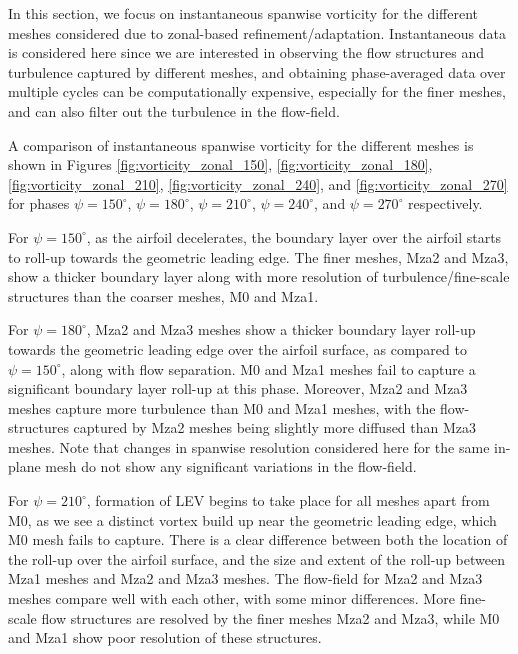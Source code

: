 In this section, we focus on instantaneous spanwise vorticity for the different meshes considered due to zonal-based refinement/adaptation. 
Instantaneous data is considered here since we are interested in observing the flow structures and turbulence captured by different meshes, and obtaining phase-averaged data over multiple cycles can be computationally expensive, especially for the finer meshes, and can also filter out the turbulence in the flow-field.

A comparison of instantaneous spanwise vorticity for the different meshes is shown in Figures \ref{fig:vorticity_zonal_150}, \ref{fig:vorticity_zonal_180}, \ref{fig:vorticity_zonal_210}, \ref{fig:vorticity_zonal_240}, and \ref{fig:vorticity_zonal_270} for phases $\psi=150^\circ$, $\psi=180^\circ$, $\psi=210^\circ$, $\psi=240^\circ$, and $\psi=270^\circ$ respectively. 

For $\psi=150^\circ$, as the airfoil decelerates, the boundary layer over the airfoil starts to roll-up towards the geometric leading edge. The finer meshes, Mza2 and Mza3, show a thicker boundary layer along with more resolution of turbulence/fine-scale structures than
the coarser meshes, M0 and Mza1.

For $\psi=180^\circ$, Mza2 and Mza3 meshes show a thicker boundary layer roll-up towards the geometric leading edge over the airfoil surface, as compared to $\psi=150^\circ$, along with flow separation. 
M0 and Mza1 meshes fail to capture a significant boundary layer roll-up at this phase. 
Moreover, Mza2 and Mza3 meshes capture more turbulence than M0 and Mza1 meshes, with the flow-structures captured by Mza2 meshes being slightly more diffused than Mza3 meshes. 
Note that changes in spanwise resolution considered here for the same in-plane mesh do not show any significant variations in the flow-field.

For $\psi=210^\circ$, formation of LEV begins to take place for all meshes apart from M0, as we see a distinct vortex build up near the geometric leading edge, which M0 mesh fails to capture. 
There is a clear difference between both the location of the roll-up over the airfoil surface, and the size and extent of the roll-up between Mza1 meshes and Mza2 and Mza3 meshes.
The flow-field for Mza2 and Mza3 meshes compare well with each other, with some minor differences.
More fine-scale flow structures are resolved by the finer meshes Mza2 and Mza3, while M0 and Mza1 show poor resolution of these structures.

